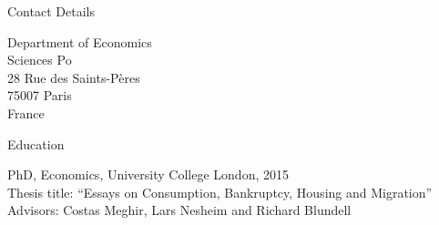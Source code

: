 \documentclass{cvjobmarket} %
\begin{document}





\begin{rSection}{Contact Details}

{Department of Economics} \\ 
{Sciences Po} \\ 
{28 Rue des Saints-Pères} \\ 
{75007 Paris} \\ 
{France} \\ 

\end{rSection}




\begin{rSection}{Education}

{PhD, Economics, University College London, 2015}\\
{Thesis title: ``Essays on Consumption, Bankruptcy, Housing and Migration''}\\
{Advisors: Costas Meghir, Lars Nesheim and Richard Blundell}\\

\end{rSection}


\end{document}
